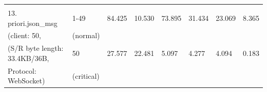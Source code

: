 \begin{table}[htbp]
\begin{tabular}{m{} m{} m{} m{} m{} m{} m{} m{}}
        & & & & & & &\\
        13. priori.json\_msg          & 1-49       & 84.425  & 10.530 & 73.895  & 31.434  & 23.069 & 8.365   \\
        (client: 50,                  & (normal)   &         &        &         &         &        &         \\
        (S/R byte length: 33.4KB/36B, & 50         & 27.577  & 22.481 & 5.097   & 4.277   & 4.094  & 0.183   \\
        Protocol: WebSocket)          & (critical) &         &        &         &         &        &                             
    \end{tabular}%
    
    \end{table}




